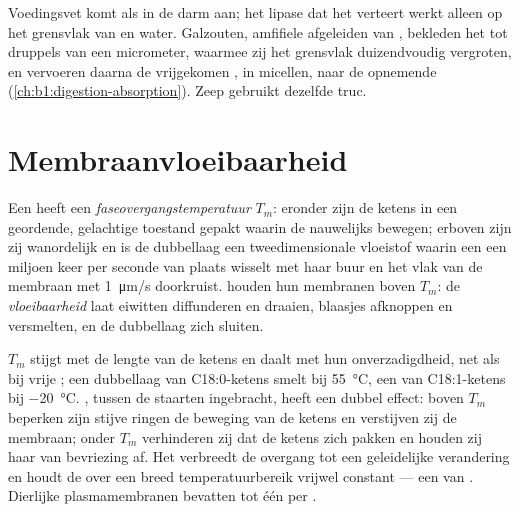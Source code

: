 \begin{example}[Galzouten]\label{ex:b1:lipids:bile}
Voedingsvet komt als  in de darm aan; het lipase dat het verteert werkt alleen
op het grensvlak van  en water. Galzouten, amfifiele afgeleiden van
, bekleden het  tot druppels van een micrometer, waarmee zij het
grensvlak duizendvoudig vergroten, en vervoeren daarna de vrijgekomen , in
micellen, naar de opnemende  (\cref{ch:b1:digestion-absorption}). Zeep
gebruikt dezelfde truc.
\end{example}

\section{Membraanvloeibaarheid}

\begin{definition}\label{def:b1:lipids:fluidity}
Een  heeft een \emph{faseovergangstemperatuur}
$T_m$: eronder zijn de ketens in een geordende, gelachtige toestand gepakt waarin
de  nauwelijks bewegen; erboven zijn zij wanordelijk en is de dubbellaag
een tweedimensionale vloeistof waarin een  een miljoen keer per seconde van
plaats wisselt met haar buur en het vlak van de membraan met \qty{1}{\micro m/s}
doorkruist.  houden hun membranen boven $T_m$: de
\emph{vloeibaarheid} laat eiwitten diffunderen en
draaien, blaasjes afknoppen en versmelten, en de dubbellaag zich sluiten.
\end{definition}

\begin{proposition}\label{prop:b1:lipids:fluidityfactors}
$T_m$ stijgt met de lengte van de ketens en daalt met hun onverzadigdheid, net als
bij vrije ; een dubbellaag van C18:0-ketens smelt bij \qty{55}{\celsius},
een van C18:1-ketens bij \qty{-20}{\celsius}. , tussen de staarten
ingebracht, heeft een dubbel effect: boven $T_m$ beperken zijn stijve ringen de
beweging van de ketens en verstijven zij de membraan; onder $T_m$ verhinderen zij
dat de ketens zich pakken en houden zij haar van bevriezing af. Het verbreedt de
overgang tot een geleidelijke verandering en houdt de  over een breed
temperatuurbereik vrijwel constant --- een  van . Dierlijke
plasmamembranen bevatten tot één  per .
\end{proposition}

